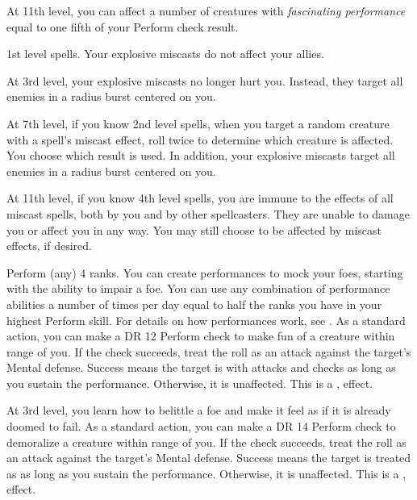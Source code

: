     At 11th level, you can affect a number of creatures with \textit{fascinating performance} equal to one fifth of your Perform check result.

    \featpre 1st level spells.
    \featben Your explosive miscasts do not affect your allies.

    At 3rd level, your explosive miscasts no longer hurt you.
    Instead, they target all enemies in a \areasmall radius burst centered on you.

    At 7th level, if you know 2nd level spells, when you target a random creature with a spell's miscast effect, roll twice to determine which creature is affected.
    You choose which result is used.
    In addition, your explosive miscasts target all enemies in a \areamed radius burst centered on you.

    At 11th level, if you know 4th level spells, you are immune to the effects of all miscast spells, both by you and by other spellcasters.
    They are unable to damage you or affect you in any way.
    You may still choose to be affected by miscast effects, if desired.

    \featpre Perform (any) 4 ranks.
    \featben You can create performances to mock your foes, starting with the ability to impair a foe.
    You can use any combination of performance abilities a number of times per day equal to half the ranks you have in your highest Perform skill.
    For details on how performances work, see .
     As a standard action, you can make a DR 12 Perform check to make fun of a creature within \rngmed range of you.
    If the check succeeds, treat the roll as an attack against the target's Mental defense.
    Success means the target is \impaired with attacks and checks as long as you sustain the performance.
    Otherwise, it is unaffected.
    This is a ,  effect.

    At 3rd level, you learn how to belittle a foe and make it feel as if it is already doomed to fail.
     As a standard action, you can make a DR 14 Perform check to demoralize a creature within \rngmed range of you.
    If the check succeeds, treat the roll as an attack against the target's Mental defense.
    Success means the target is treated as \bloodied as long as you sustain the performance.
    Otherwise, it is unaffected.
    This is a ,  effect.


